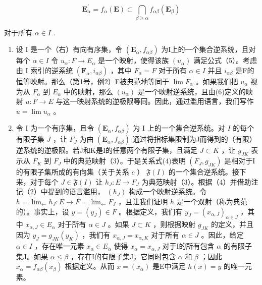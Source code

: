 \[
\mathbf {E} _ {\alpha} ^ {\prime} = f _ {\alpha} (\mathbf {E}) \subset \bigcap_ {\beta \geqslant \alpha} f _ {\alpha \beta} (\mathbf {E} _ {\beta})\tag{10}
\]

对于所有 \(\alpha \in I\) .

\begin{enumerate}
\def\labelenumi{(\arabic{enumi})}
\setcounter{enumi}{1}
\item
  设 I 是一个（右）有向有序集，令 \((\mathbf{E}_{\alpha}, f_{\alpha\beta})\) 为I上的一个集合逆系统，且对每个 \(\alpha \in I\) 令 \(u_{\alpha}: F \to E_{\alpha}\) 是一个映射，使得该族 \((u_{\alpha})\) 满足公式（5）。考虑由 I 索引的逆系统 \((\mathbf{F}_{\alpha}, i_{\alpha\beta})\) ，其中 \(F_{\alpha} = F\) 对于所有 \(\alpha \in I\) 并且 \(i_{\alpha\beta}\) 是F的恒等映射。那么（第1号，例2）F被典范地等同于 \(\lim F_{\alpha}\) 。如果我们把 \(u_{\alpha}\) 视为从 \(F_{\alpha}\) 到 \(E_{\alpha}\) 中的映射，那么 \((u_{\alpha})\) 是一个映射逆系统，且由(6)定义的映射 \(u: F \to E\) 与这一映射系统的逆极限等同。因此，通过滥用语言，我们写作 \(u = \lim u_{\alpha}\) 。
\item
  令 I 为一个有序集，且令 \((\mathbf{E}_{\alpha}, f_{\alpha \beta})\) 为 I 上的一个集合逆系统。对 \(I\) 的每个有限子集 \(J\) ，让 \(F_{J}\) 为由 \((\mathbf{E}_{\alpha}, f_{\alpha \beta})\) 通过将指标集限制为J而得到的（有限）逆系统的逆极限。若J和K是I的任意两个有限子集，且满足 \(J \subset K\) ，让 \(g_{JK}\) 表示从 \(F_{K}\) 到 \(F_{J}\) 中的典范映射（3）。于是关系式(4)表明 \((F_{J}, g_{JK})\) 是相对于I的有限子集所成的有向集（关于关系 \(c\) ） \(\mathfrak{F}(I)\) 的一个集合逆系统。接下来，对于每个 \(J \in \mathfrak{F}(I)\) 让 \(h_{J}: E \to F_{J}\) 为典范映射（3）。根据（4）并借助注记（2）中提到的语言滥用， \((h_{J})\) 构成一个映射逆系统。令 \(h = \lim_{\leftarrow} h_{J}: E \to F = \lim_{\leftarrow} F_{J}\) ，且让我们证明 \(h\) 是一个双射（称为典范的）。事实上，设 \(y = (y_{J}) \in F\) 。根据定义，我们有 \(y_{J} = (x_{\alpha, J})_{\alpha \in J}\) ，其中 \(x_{\alpha, J} \in E_{\alpha}\) 对于所有 \(\alpha \in J\) 。如果 \(J \subset K\) ，则根据映射 \(g_{JK}\) 的定义，并且因为 \(y_{J} = g_{JK}(y_{K})\) ，我们有 \(x_{\alpha, J} = x_{\alpha, K}\) 对于所有 \(\alpha \in J\) 。因此，给定 \(\alpha \in I\) ，存在唯一元素 \(x_{\alpha} \in E_{\alpha}\) 使得 \(x_{\alpha} = x_{\alpha, J}\) 对于I的所有包含 \(\alpha\) 的有限子集J。如果 \(\alpha \leqslant \beta\) ，存在I的有限子集J，它同时包含 \(\alpha\) 和 \(\beta\) ；因此 \(x_{\alpha} = f_{\alpha \beta}(x_{\beta})\) 根据定义。从而 \(x = (x_{\alpha})\) 是E中满足 \(h(x) = y\) 的唯一元素。
\end{enumerate}

